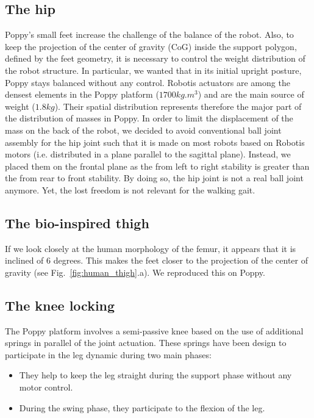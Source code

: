 \subsection{The hip} %
Poppy's small feet increase the challenge of the balance of the robot.
Also, to keep the projection of the center of gravity (CoG) inside the support polygon, defined by the feet geometry, it is necessary to control the weight distribution of the robot structure.
In particular, we wanted that in its initial upright posture, Poppy stays balanced without any control.
 Robotis actuators are among the densest elements in the Poppy platform ($ 1700 kg.m^{3} $) and are the main source of weight ($1.8 kg$).
 Their spatial distribution represents therefore the major part of the distribution of masses in Poppy.
In order to limit the displacement of the mass on the back of the robot, we decided to avoid conventional ball joint assembly for the hip joint such that it is made on most robots based on Robotis motors (i.e.
distributed in a plane parallel to the sagittal plane).
Instead, we placed them on the frontal plane as the from left to right stability is greater than the from rear to front stability.
By doing so, the hip joint is not a real ball joint anymore.
Yet, the lost freedom is not relevant for the walking gait.

\subsection{The bio-inspired thigh} %
If we look closely at the human morphology of the femur, it appears that it is inclined of 6 degrees.
This makes the feet closer to the projection of the center of gravity (see Fig.~\ref{fig:human_thigh}.a).
We reproduced this on Poppy.


\subsection{The knee locking} %
The Poppy platform involves a semi-passive knee based on the use of additional springs in parallel of the joint actuation.
These springs have been design to participate in the leg dynamic during two main phases:
\begin{itemize}
    \item They help to keep the leg straight during the support phase without any motor control.
    \item During the swing phase, they participate to the flexion of the leg.
\end{itemize}

